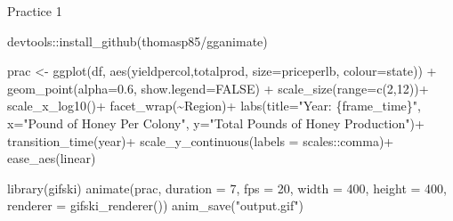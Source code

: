 \documentclass[
]{article}
\newenvironment{Shaded}{\begin{snugshade}}{\end{snugshade}}
\newcommand{\AttributeTok}[1]{\textcolor[rgb]{0.77,0.63,0.00}{#1}}
\newcommand{\ConstantTok}[1]{\textcolor[rgb]{0.00,0.00,0.00}{#1}}
\newcommand{\DecValTok}[1]{\textcolor[rgb]{0.00,0.00,0.81}{#1}}
\newcommand{\FloatTok}[1]{\textcolor[rgb]{0.00,0.00,0.81}{#1}}
\newcommand{\FunctionTok}[1]{\textcolor[rgb]{0.00,0.00,0.00}{#1}}
\newcommand{\NormalTok}[1]{#1}
\newcommand{\OtherTok}[1]{\textcolor[rgb]{0.56,0.35,0.01}{#1}}
\newcommand{\SpecialCharTok}[1]{\textcolor[rgb]{0.00,0.00,0.00}{#1}}
\newcommand{\StringTok}[1]{\textcolor[rgb]{0.31,0.60,0.02}{#1}}
\begin{document}
Practice 1

\begin{Shaded}
\begin{Highlighting}[]
\NormalTok{devtools}\SpecialCharTok{::}\FunctionTok{install\_github}\NormalTok{(}\StringTok{\textquotesingle{}thomasp85/gganimate\textquotesingle{}}\NormalTok{)}

\NormalTok{prac }\OtherTok{\textless{}{-}} \FunctionTok{ggplot}\NormalTok{(df, }\FunctionTok{aes}\NormalTok{(yieldpercol,totalprod, }\AttributeTok{size=}\NormalTok{priceperlb, }\AttributeTok{colour=}\NormalTok{state)) }\SpecialCharTok{+}
  \FunctionTok{geom\_point}\NormalTok{(}\AttributeTok{alpha=}\FloatTok{0.6}\NormalTok{, }\AttributeTok{show.legend=}\ConstantTok{FALSE}\NormalTok{) }\SpecialCharTok{+}
  \FunctionTok{scale\_size}\NormalTok{(}\AttributeTok{range=}\FunctionTok{c}\NormalTok{(}\DecValTok{2}\NormalTok{,}\DecValTok{12}\NormalTok{))}\SpecialCharTok{+}
  \FunctionTok{scale\_x\_log10}\NormalTok{()}\SpecialCharTok{+}
  \FunctionTok{facet\_wrap}\NormalTok{(}\SpecialCharTok{\textasciitilde{}}\NormalTok{Region)}\SpecialCharTok{+}
  \FunctionTok{labs}\NormalTok{(}\AttributeTok{title=}\StringTok{"Year: \{frame\_time\}"}\NormalTok{, }\AttributeTok{x=}\StringTok{"Pound of Honey Per Colony"}\NormalTok{, }\AttributeTok{y=}\StringTok{"Total Pounds of Honey Production"}\NormalTok{)}\SpecialCharTok{+}
  \FunctionTok{transition\_time}\NormalTok{(year)}\SpecialCharTok{+}
  \FunctionTok{scale\_y\_continuous}\NormalTok{(}\AttributeTok{labels =}\NormalTok{ scales}\SpecialCharTok{::}\NormalTok{comma)}\SpecialCharTok{+}
  \FunctionTok{ease\_aes}\NormalTok{(}\StringTok{\textquotesingle{}linear\textquotesingle{}}\NormalTok{)}
  
\FunctionTok{library}\NormalTok{(gifski)}
\FunctionTok{animate}\NormalTok{(prac, }\AttributeTok{duration =} \DecValTok{7}\NormalTok{, }\AttributeTok{fps =} \DecValTok{20}\NormalTok{, }\AttributeTok{width =} \DecValTok{400}\NormalTok{, }\AttributeTok{height =} \DecValTok{400}\NormalTok{, }\AttributeTok{renderer =} \FunctionTok{gifski\_renderer}\NormalTok{())}
\FunctionTok{anim\_save}\NormalTok{(}\StringTok{"output.gif"}\NormalTok{)}
\end{Highlighting}
\end{Shaded}
\end{document}
